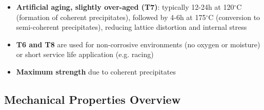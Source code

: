 \documentclass{article}
\begin{document}
\begin{itemize}
  \item \textbf{Artificial aging, slightly over-aged (T7)}: typically 12-24h at 120$^\circ$C (formation of coherent precipitates), followed by 4-6h at 175$^\circ$C (conversion to semi-coherent precipitates), reducing lattice distortion and internal stress
  \item \textbf{T6 and T8} are used for non-corrosive environments (no oxygen or moisture) or short service life application (e.g. racing)
  \item \textbf{Maximum strength} due to coherent precipitates
\end{itemize}

\newpage
\subsection{Mechanical Properties Overview}
\end{document}
